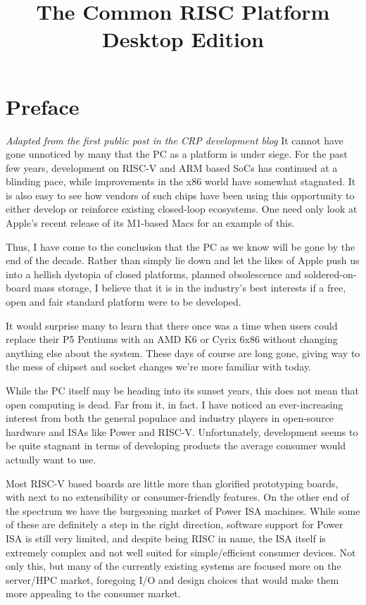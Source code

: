 \documentclass[12pt]{report}
\title{The Common RISC Platform\\ \large{Desktop Edition}}
\begin{document}
\maketitle

\newpage

\tableofcontents
\newpage

\section{Preface}
\textit{Adapted from the first public post in the CRP development blog}
It cannot have gone unnoticed by many that the PC as a platform is under siege. For the past few years, development on
RISC-V and ARM based SoCs has continued at a blinding pace, while improvements in the x86 world have somewhat stagnated.
It is also easy to see how vendors of such chips have been using this opportunity to either develop or reinforce existing
closed-loop ecosystems. One need only look at Apple’s recent release of its M1-based Macs for an example of this.

Thus, I have come to the conclusion that the PC as we know will be gone by the end of the decade. Rather than simply lie down
and let the likes of Apple push us into a hellish dystopia of closed platforms, planned obsolescence and soldered-on-board
mass storage, I believe that it is in the industry’s best interests if a free, open and fair standard platform were to be developed.

It would surprise many to learn that there once was a time when users could replace their P5 Pentiums with an AMD K6 or Cyrix
6x86 without changing anything else about the system. These days of course are long gone, giving way to the mess of chipset and
socket changes we’re more familiar with today.

While the PC itself may be heading into its sunset years, this does not mean that open computing is dead. Far from it, in fact.
I have noticed an ever-increasing interest from both the general populace and industry players in open-source hardware and ISAs like
Power and RISC-V. Unfortunately, development seems to be quite stagnant in terms of developing products the average consumer would
actually want to use.

Most RISC-V based boards are little more than glorified prototyping boards, with next to no extensibility or consumer-friendly features.
On the other end of the spectrum we have the burgeoning market of Power ISA machines. While some of these are definitely a step in the
right direction, software support for Power ISA is still very limited, and despite being RISC in name, the ISA itself is extremely
complex and not well suited for simple/efficient consumer devices. Not only this, but many of the currently existing systems are focused
more on the server/HPC market, foregoing I/O and design choices that would make them more appealing to the consumer market.
\end{document}
